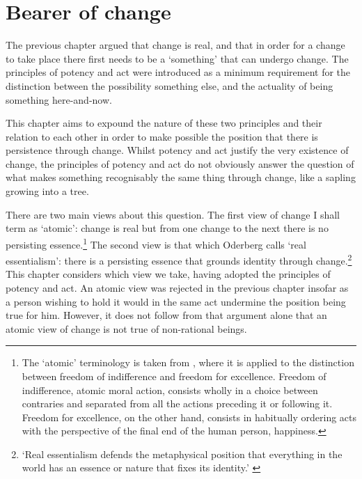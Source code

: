 
\chapter{Bearer of change}
\label{ch:permanence}

The previous chapter argued that change is real, and that in order for a change to take place there first needs to be a `something' that can undergo change. The principles of potency and act were introduced as a minimum requirement for the distinction between the possibility something else, and the actuality of being something here-and-now.

This chapter aims to expound the nature of these two principles and their relation to each other in order to make possible the position that there is persistence through change. Whilst potency and act justify the very existence of change, the principles of potency and act do not obviously answer the question of what makes something recognisably the same thing through change, like a sapling growing into a tree.

There are two main views about this question. The first view of change I shall term as `atomic': change is real but from one change to the next there is no persisting essence.\footnote{The `atomic' terminology is taken from \textcite[][336]{pinckaers1995sources}, where it is applied to the distinction between freedom of indifference and freedom for excellence. Freedom of indifference, atomic moral action, consists wholly in a choice between contraries and separated from all the actions preceding it or following it. Freedom for excellence, on the other hand, consists in habitually ordering acts with the perspective of the final end of the human person, happiness.} The second view is that which Oderberg calls `real essentialism': there is a persisting essence that grounds identity through change.\footnote{`Real essentialism defends the metaphysical position that everything in the world has an essence or nature that fixes its identity.' \parencite[][]{Oderberg2007-ODERE-2}} This chapter considers which view we take, having adopted the principles of potency and act. An atomic view was rejected in the previous chapter insofar as a person wishing to hold it would in the same act undermine the position being true for him. However, it does not follow from that argument alone that an atomic view of change is not true of non-rational beings.

